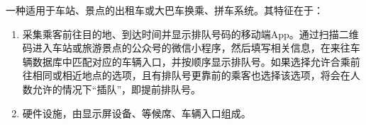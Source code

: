 一种适用于车站、景点的出租车或大巴车换乘、拼车系统。其特征在于：
\begin{enumerate}
	\item 采集乘客前往目的地、到达时间并显示排队号码的移动端App。通过扫描二维码进入车站或旅游景点的公众号的微信小程序，然后填写相关信息，在来往车辆数据库中匹配对应的车辆入口，并按顺序显示排队号。如果选择允许合乘前往相同或相近地点的选项，且有排队号更靠前的乘客也选择该选项，将会在人数允许的情况下“插队”，即提前排队号。
	\item 硬件设施，由显示屏设备、等候席、车辆入口组成。
\end{enumerate}
